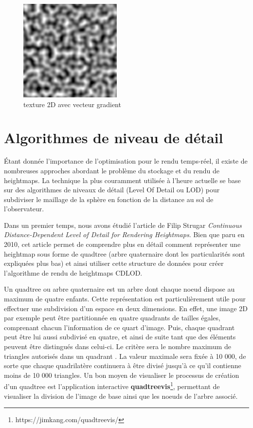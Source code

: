 \documentclass[12pt]{report}
\begin{document}
\begin{enumerate}
    \begin{figure}[h]
        \centering
        \includegraphics[scale = 0.5]{images/gradientcoherentnoise2d.png}
        \caption{texture 2D avec vecteur gradient}
    \end{figure}
    
\end{enumerate}

\newpage

\section{Algorithmes de niveau de détail}

Étant donnée l'importance de l'optimisation pour le rendu temps-réel, il existe de nombreuses approches abordant le problème du stockage et du rendu de heightmaps. La technique la plus couramment utilisée à l'heure actuelle se base sur des algorithmes de niveaux de détail (Level Of Detail ou LOD) pour subdiviser le maillage de la sphère en fonction de la distance au sol de l'observateur.

Dans un premier temps, nous avons étudié l'article de Filip Strugar \textit{Continuous Distance-Dependent Level of Detail for Rendering Heightmaps}\textbf{\cite{FStrugar}}. Bien que paru en 2010, cet article permet de comprendre plus en détail comment représenter une heightmap sous forme de quadtree (arbre quaternaire dont les particularités sont expliquées plus bas) et ainsi utiliser cette structure de données pour créer l'algorithme de rendu de heightmaps CDLOD.

Un quadtree ou arbre quaternaire est un arbre dont chaque noeud dispose au maximum de quatre enfants. Cette représentation est particulièrement utile pour effectuer une subdivision d'un espace en deux dimensions. En effet, une image 2D par exemple peut être partitionnée en quatre quadrants de tailles égales, comprenant chacun l'information de ce quart d'image. Puis, chaque quadrant peut être lui aussi subdivisé en quatre, et ainsi de suite tant que des éléments peuvent être distingués dans celui-ci. Le critère sera le nombre maximum de triangles autorisés dans un quadrant . La valeur maximale sera fixée à 10 000, de sorte que chaque quadrilatère continuera à être divisé jusqu'à ce qu'il contienne moins de 10 000 triangles.  Un bon moyen de visualiser le processus de création d'un quadtree est l'application interactive \textbf{quadtreevis}\footnote{https://jimkang.com/quadtreevis/}, permettant de visualiser la division de l'image de base ainsi que les noeuds de l'arbre associé.
\end{document}
